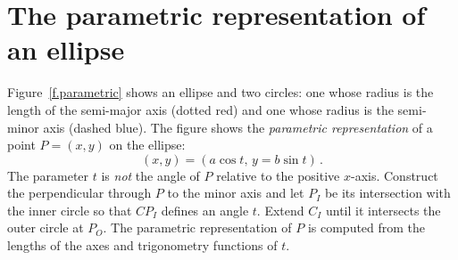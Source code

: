 
\section{The parametric representation of an ellipse}

Figure~\ref{f.parametric} shows an ellipse and two circles: one whose radius is the length of the semi-major axis (dotted red) and one whose radius is the semi-minor axis (dashed blue). The figure shows the \emph{parametric representation} of a point $P=(x,y)$ on the ellipse:
\[
(x,y)= (a\cos t,\, y = b \sin t)\,.
\]
The parameter $t$ is \emph{not} the angle of $P$ relative to the positive $x$-axis. Construct the perpendicular through $P$ to the minor axis and let $P_I$ be its intersection with the inner circle so that $CP_I$ defines an angle $t$.  Extend $C_I$ until it intersects the outer circle at $P_O$. The parametric representation of $P$ is computed from the lengths of the axes and trigonometry functions of $t$.


